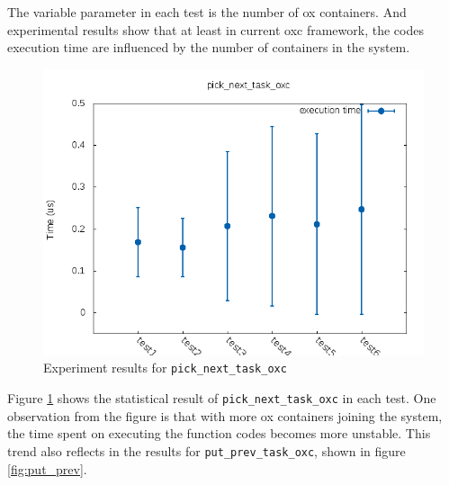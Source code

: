 The variable parameter in each test is the number of ox containers.
And experimental results show that at least in current oxc framework, the
codes execution time are influenced by the number of containers in the
system.
\begin{figure}[h!]%
        \centering
        \includegraphics[width=\textwidth]{images/pick_next_task_oxc}
        \caption{Experiment results for \texttt{pick\_next\_task\_oxc}}
        \label{fig:pick_next}
\end{figure}

Figure \ref{fig:pick_next} shows the statistical result of 
\texttt{pick\_next\_task\_oxc} in each test. One observation from the figure
is that with more ox containers joining the system, the time spent on executing
the function codes becomes more unstable. This trend also reflects in the
results for \texttt{put\_prev\_task\_oxc}, shown in figure \ref{fig:put_prev}.

